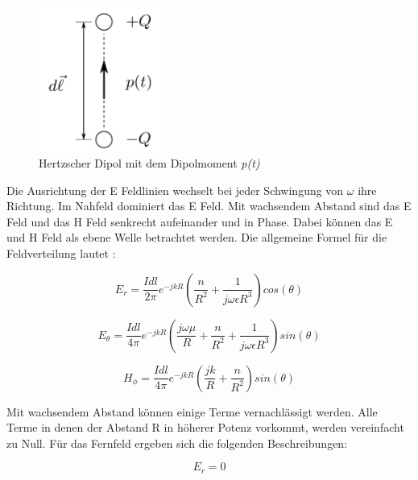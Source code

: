 \begin{figure}[!htb]
	\centering
	\includegraphics[width=4cm]{content/bilder/HerzDipolEMANTS37.pdf}%
	\caption{Hertzscher Dipol mit dem Dipolmoment \textit{p(t)} \cite{Emant}}
	\label{HerzDipol}
\end{figure}

Die Ausrichtung der E Feldlinien wechselt bei jeder Schwingung von $\omega$ ihre Richtung. Im Nahfeld dominiert das E Feld. Mit wachsendem Abstand sind das E Feld und das H Feld senkrecht aufeinander und in Phase. Dabei können das E und H Feld als ebene Welle betrachtet werden. Die allgemeine Formel für die Feldverteilung lautet \cite{elliott1981antenna}:



\begin{equation}
E_r= \frac{I dl}{2\pi}   e^{-jkR} \left( \frac{n}{R^{2}}  + \frac{1}{j\omega \epsilon R^{3}}\right) cos(\theta)
\end{equation}

\begin{equation}
E_\theta= \frac{I dl}{4\pi}   e^{-jkR} \left( \frac{j\omega \mu}{R}  + \frac{n}{R^{2}}+ \frac{1}{j\omega \epsilon R^{3}}\right) sin(\theta)
\end{equation}

\begin{equation}
H_\phi= \frac{I dl}{4\pi}   e^{-jkR} \left( \frac{jk}{R}  + \frac{n}{R^{2}}\right) sin(\theta)
\end{equation}

Mit wachsendem Abstand können einige Terme vernachlässigt werden. Alle Terme in denen der Abstand R in höherer Potenz vorkommt, werden vereinfacht zu Null. Für das Fernfeld ergeben sich die folgenden Beschreibungen:


\begin{equation}
E_r= 0
\end{equation}

